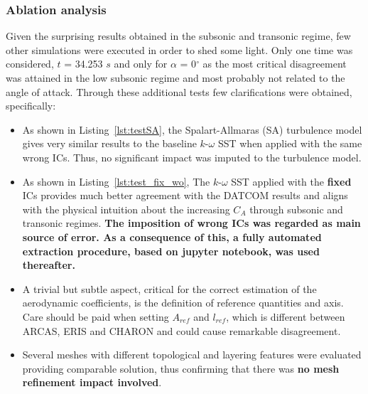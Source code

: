 \documentclass[12pt]{article}
\begin{document}
\subsubsection{Ablation analysis}\label{subsubsec:ablation}
Given the surprising results obtained in the subsonic and transonic regime,
few other simulations were executed in order to shed some light. Only one time
was considered, $t$ = 34.253 $s$ and only for $\alpha$ = 0$^\circ$ as the most critical disagreement was attained in the low subsonic regime and most probably not related to the angle of attack. Through these additional tests few clarifications were obtained, specifically:

\begin{itemize}
    \item As shown in Listing~\ref{lst:testSA}, the Spalart-Allmaras (SA) turbulence model gives very similar results to the baseline $k$-$\omega$ SST when applied with the same wrong ICs. Thus, no significant impact was imputed to the turbulence model.
    \item As shown in Listing~\ref{lst:test_fix_wo}, The $k$-$\omega$ SST applied with the \textbf{fixed} ICs provides much better agreement with the DATCOM results and aligns with the physical intuition about the increasing $C_A$ through subsonic and transonic regimes. \textbf{The imposition of wrong ICs was regarded as main source of error. As a consequence of this, a fully automated extraction procedure, based on jupyter notebook, was used thereafter.} 
    \item A trivial but subtle aspect, critical for the correct estimation of the aerodynamic coefficients, is the definition of reference quantities and axis. Care should be paid when setting $A_{ref}$ and $l_{ref}$, which is different between ARCAS, ERIS and CHARON and could cause remarkable disagreement.
    \item Several meshes with different topological and layering features were evaluated providing comparable solution, thus confirming that there was \textbf{no mesh refinement impact involved}.
\end{itemize}
\end{document}
